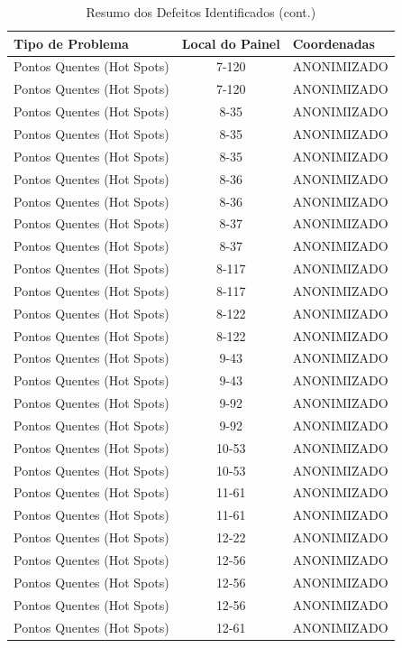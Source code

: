 \documentclass[dvipsnames]{article}%
\begin{document}
\begin{table}[h!]%
\caption{Resumo dos Defeitos Identificados (cont.)}%
\centering%
\begin{tabular}{lcl}%
\toprule%
Tipo de Problema&Local do Painel&Coordenadas\\%
\midrule%
Pontos Quentes (Hot Spots)&7{-}120&ANONIMIZADO\\%
Pontos Quentes (Hot Spots)&7{-}120&ANONIMIZADO\\%
Pontos Quentes (Hot Spots)&8{-}35&ANONIMIZADO\\%
Pontos Quentes (Hot Spots)&8{-}35&ANONIMIZADO\\%
Pontos Quentes (Hot Spots)&8{-}35&ANONIMIZADO\\%
Pontos Quentes (Hot Spots)&8{-}36&ANONIMIZADO\\%
Pontos Quentes (Hot Spots)&8{-}36&ANONIMIZADO\\%
Pontos Quentes (Hot Spots)&8{-}37&ANONIMIZADO\\%
Pontos Quentes (Hot Spots)&8{-}37&ANONIMIZADO\\%
Pontos Quentes (Hot Spots)&8{-}117&ANONIMIZADO\\%
Pontos Quentes (Hot Spots)&8{-}117&ANONIMIZADO\\%
Pontos Quentes (Hot Spots)&8{-}122&ANONIMIZADO\\%
Pontos Quentes (Hot Spots)&8{-}122&ANONIMIZADO\\%
Pontos Quentes (Hot Spots)&9{-}43&ANONIMIZADO\\%
Pontos Quentes (Hot Spots)&9{-}43&ANONIMIZADO\\%
Pontos Quentes (Hot Spots)&9{-}92&ANONIMIZADO\\%
Pontos Quentes (Hot Spots)&9{-}92&ANONIMIZADO\\%
Pontos Quentes (Hot Spots)&10{-}53&ANONIMIZADO\\%
Pontos Quentes (Hot Spots)&10{-}53&ANONIMIZADO\\%
Pontos Quentes (Hot Spots)&11{-}61&ANONIMIZADO\\%
Pontos Quentes (Hot Spots)&11{-}61&ANONIMIZADO\\%
Pontos Quentes (Hot Spots)&12{-}22&ANONIMIZADO\\%
Pontos Quentes (Hot Spots)&12{-}56&ANONIMIZADO\\%
Pontos Quentes (Hot Spots)&12{-}56&ANONIMIZADO\\%
Pontos Quentes (Hot Spots)&12{-}56&ANONIMIZADO\\%
Pontos Quentes (Hot Spots)&12{-}61&ANONIMIZADO\\%

\end{tabular}
\end{table}
\end{document}
